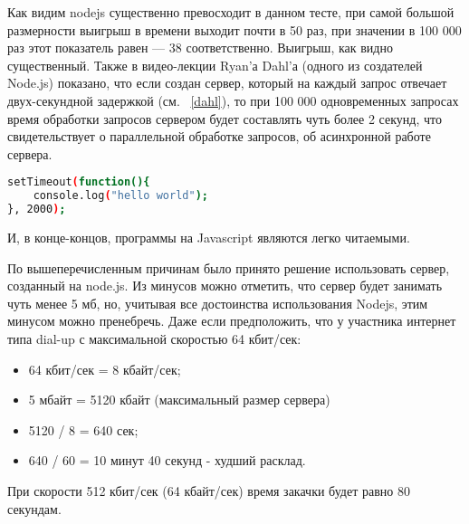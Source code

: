 Как видим nodejs существенно превосходит в данном тесте, при самой большой размерности выигрыш в времени выходит почти в 50 раз, при значении в 100 000 раз этот показатель равен — 38 соответственно. Выигрыш, как видно существенный.
Также в видео-лекции Ryan'а Dahl'а (одного из создателей Node.js) показано, что если создан сервер, который на каждый запрос отвечает двух-секундной задержкой (см. ~\ref{dahl}), то при 100 000 одновременных запросах время обработки запросов сервером будет составлять чуть более 2 секунд, что свидетельствует о параллельной обработке запросов, об асинхронной работе сервера.\begin{lstlisting}[numbers=none, language=bash, caption =Тело функции обработки запроса в Node.js,
 			label=dahl]
  setTimeout(function(){
	console.log("hello world");
}, 2000);
\end{lstlisting}

И, в конце-концов, программы на Javascript являются легко читаемыми.

По вышеперечисленным причинам было принято решение использовать сервер, созданный на node.js. Из минусов можно отметить, что сервер будет занимать чуть менее 5 мб, но, учитывая все достоинства использования Nodejs, этим минусом можно пренебречь. Даже если предположить, что у участника интернет типа dial-up с максимальной скоростью 64 кбит/сек:
\begin{itemize}
 \item 64 кбит/сек = 8 кбайт/сек;
  \item 5 мбайт = 5120 кбайт  (максимальный размер сервера)
  \item 5120 / 8 = 640 сек;
  \item 640 / 60 = 10 минут 40 секунд - худший расклад.
\end{itemize}
При скорости 512 кбит/сек (64 кбайт/сек) время закачки будет равно 80 секундам.
